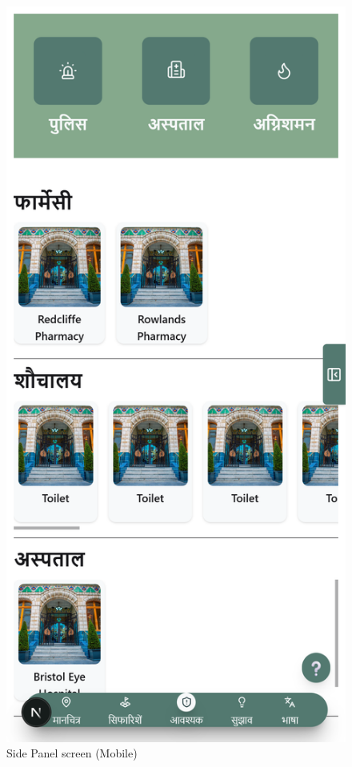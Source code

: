 \begin{figure}[H]
    \centering
    \includegraphics[height=0.3\textheight,keepaspectratio]{images/3_sidepanel_mobile.png}
    \caption{Side Panel screen (Mobile)}
\end{figure}

